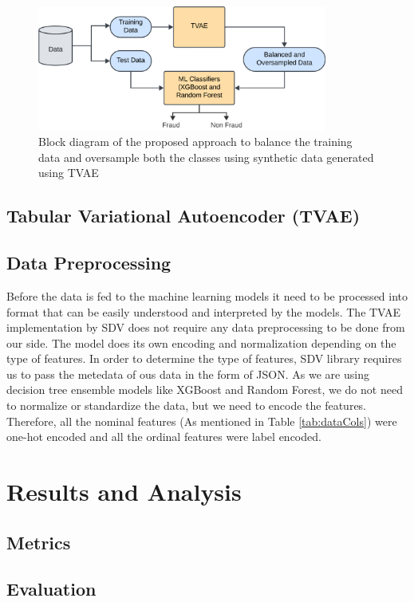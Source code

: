 \documentclass[twoside,11pt]{article}
\begin{document}
\begin{figure}
  \centering
  \includegraphics[width=0.85\textwidth]{images/model_tvae.png}
  \caption{Block diagram of the proposed approach to balance the training data and oversample both the classes using synthetic data generated using TVAE}
  \label{fig:model}
\end{figure}

\subsection{Tabular Variational Autoencoder (TVAE)}

\subsection{Data Preprocessing}
Before the data is fed to the machine learning models it need to be processed into format that can be easily understood and interpreted by the models. The TVAE implementation by SDV does not require any data preprocessing to be done from our side. The model does its own encoding and normalization depending on the type of features. In order to determine the type of features, SDV library requires us to pass the metedata of ous data in the form of JSON. As we are using decision tree ensemble models like XGBoost and Random Forest, we do not need to normalize or standardize the data, but we need to encode the features. Therefore, all the nominal features (As mentioned in Table \ref{tab:dataCols}) were one-hot encoded and all the ordinal features were label encoded.

\section{Results and Analysis}  \label{sec:result}
\subsection{Metrics}

\subsection{Evaluation}
\end{document}
